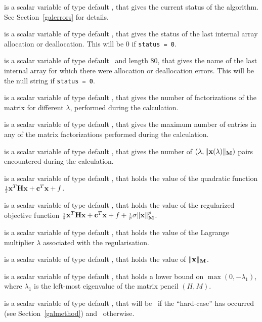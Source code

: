 \documentclass{galahad}
\begin{document}
\begin{description}
 is a scalar variable of type default \integer, that gives the
current status of the algorithm. See Section~\ref{galerrors} for details.

 is a scalar variable of type default \integer,
that gives the status of the last internal array allocation
or deallocation. This will be 0 if {\tt status = 0}.

 is a scalar variable of type default \character\
and length 80, that  gives the name of the last internal array
for which there were allocation or deallocation errors.
This will be the null string if {\tt status = 0}.

 is a scalar variable of type default \integer, that
gives the number of factorizations of the matrix \req{kkt}
for different $\lambda$, performed during the calculation.

 is a scalar variable of type default \integer, that
gives the maximum number of entries in any of the matrix factorizations
performed during the calculation.

 is a scalar variable of type default \integer, that gives
the number of $(\lambda,\|{\mathbf{x}}(\lambda)\|_{{\mathbf{M}}})$ pairs encountered during the
calculation.

 is a scalar variable of type default \realdp, that holds the
value of the quadratic function ${\scriptstyle \frac{1}{2}} {\mathbf{x}}^T {\mathbf{H}} {\mathbf{x}}  +  {\mathbf{c}}^T {\mathbf{x}} + f$.

 is a scalar variable of type default \realdp, that
holds the value of the regularized objective function ${\scriptstyle \frac{1}{2}} {\mathbf{x}}^T {\mathbf{H}} {\mathbf{x}}
 + {\mathbf{c}}^T {\mathbf{x}} + f + {\scriptstyle \frac{1}{p}} \sigma \|{\mathbf{x}}\|_{{\mathbf{M}}}^p$.

 is a scalar variable of type default \realdp, that holds the
value of the Lagrange multiplier $\lambda$ associated with the regularisation.

 is a scalar variable of type default \realdp,
that holds the value of $\|{\mathbf{x}}\|_{{\mathbf{M}}}$.

 is a scalar variable of type default \realdp, that holds a lower
bound on $\max(0,-\lambda_1)$, where $\lambda_1$ is the left-most eigenvalue of
the matrix pencil $(H,M)$.

 is a scalar variable of type default \logical, that will be
\true\ if the ``hard-case'' has occurred (see Section~\ref{galmethod})
and \false\ otherwise.


\end{description}
\end{document}
